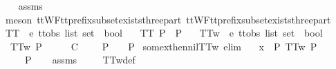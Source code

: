 \begin{isabellebody}
%
\isadelimproof
\ \ %
\endisadelimproof
%
\isatagproof
{}\isamarkupfalse%
\ assms\isanewline
\ \ \isamarkupfalse%
\ {\isacharparenleft}meson\ ttWF{\isacharunderscore}tt{\isacharunderscore}prefix{\isacharunderscore}subset{\isacharunderscore}exists{\isacharunderscore}three{\isacharunderscore}part\ ttWF{\isacharunderscore}tt{\isacharunderscore}prefix{\isacharunderscore}subset{\isacharunderscore}exists{\isacharunderscore}three{\isacharunderscore}part{\isacharprime}{\isacharparenright}%
\endisatagproof
{\isafoldproof}%
%
\isadelimproof
%
\endisadelimproof
%
\isadelimdocument
%
\endisadelimdocument
%
\isatagdocument
%
\isamarkuptrue%
%
\endisatagdocument
{\isafolddocument}%
%
\isadelimdocument
%
\endisadelimdocument
{}\isamarkupfalse%
\ TT{}\ {\isacharcolon}{\isacharcolon}\ {\isachardoublequoteopen}{\isacharprime}e\ ttobs\ list\ set\ {\isasymRightarrow}\ bool{\isachardoublequoteclose}\ \isanewline
\ \ {\isachardoublequoteopen}TT{}\ P\ {\isacharequal}\ {\isacharparenleft}P\ {\isasymnoteq}\ {\isacharbraceleft}{\isacharbraceright}{\isacharparenright}{\isachardoublequoteclose}\isanewline
\isanewline
{}\isamarkupfalse%
\ TT{}w\ {\isacharcolon}{\isacharcolon}\ {\isachardoublequoteopen}{\isacharprime}e\ ttobs\ list\ set\ {\isasymRightarrow}\ bool{\isachardoublequoteclose}\ \isanewline
\ \ {\isachardoublequoteopen}TT{}w\ P\ {\isacharequal}\ {\isacharparenleft}{\isasymforall}\ {\isasymrho}\ {\isasymsigma}{\isachardot}\ {\isacharparenleft}{\isasymrho}\ {\isasymle}\isactrlsub C\ {\isasymsigma}\ {\isasymand}\ {\isasymsigma}\ {\isasymin}\ P{\isacharparenright}\ {\isasymlongrightarrow}\ {\isasymrho}\ {\isasymin}\ P{\isacharparenright}{\isachardoublequoteclose}\isanewline
\isanewline
{}\isamarkupfalse%
\ some{\isacharunderscore}x{\isacharunderscore}then{\isacharunderscore}nil{\isacharunderscore}TT{}w\ {\isacharbrackleft}elim{\isacharbrackright}{\isacharcolon}\isanewline
\ \ \ {\isachardoublequoteopen}x\ {\isasymin}\ P{\isachardoublequoteclose}\ {\isachardoublequoteopen}TT{}w\ P{\isachardoublequoteclose}\isanewline
\ \ \ {\isachardoublequoteopen}{\isacharbrackleft}{\isacharbrackright}\ {\isasymin}\ P{\isachardoublequoteclose}\isanewline
%
\isadelimproof
\ \ %
\endisadelimproof
%
\isatagproof
{}\isamarkupfalse%
\ assms\ \isanewline
\ \ \isamarkupfalse%
\ TT{}w{\isacharunderscore}def\ \isamarkupfalse%

\end{isabellebody}
